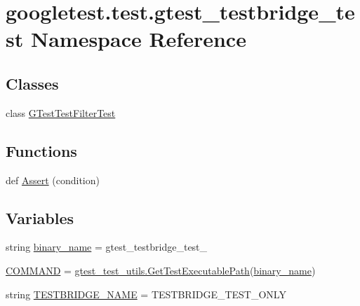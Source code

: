 \hypertarget{namespacegoogletest_1_1test_1_1gtest__testbridge__test}{}\section{googletest.\+test.\+gtest\+\_\+testbridge\+\_\+test Namespace Reference}
\label{namespacegoogletest_1_1test_1_1gtest__testbridge__test}
\subsection*{Classes}
\begin{DoxyCompactItemize}
\item 
class \mbox{\hyperlink{classgoogletest_1_1test_1_1gtest__testbridge__test_1_1_g_test_test_filter_test}{G\+Test\+Test\+Filter\+Test}}
\end{DoxyCompactItemize}
\subsection*{Functions}
\begin{DoxyCompactItemize}
\item 
def \mbox{\hyperlink{namespacegoogletest_1_1test_1_1gtest__testbridge__test_a50b2fc33de061274aedcf8fc6bca4789}{Assert}} (condition)
\end{DoxyCompactItemize}
\subsection*{Variables}
\begin{DoxyCompactItemize}
\item 
string \mbox{\hyperlink{namespacegoogletest_1_1test_1_1gtest__testbridge__test_a59ccdbf94eb879ba6516ba5b6c72719d}{binary\+\_\+name}} = \textquotesingle{}gtest\+\_\+testbridge\+\_\+test\+\_\+\textquotesingle{}
\item 
\mbox{\hyperlink{namespacegoogletest_1_1test_1_1gtest__testbridge__test_ad683cde9a7659541db7f4977ce799374}{C\+O\+M\+M\+A\+ND}} = \mbox{\hyperlink{namespacegoogletest_1_1test_1_1gtest__test__utils_ac9af888c702350aac56b154a6af34098}{gtest\+\_\+test\+\_\+utils.\+Get\+Test\+Executable\+Path}}(\mbox{\hyperlink{namespacegoogletest_1_1test_1_1gtest__testbridge__test_a59ccdbf94eb879ba6516ba5b6c72719d}{binary\+\_\+name}})
\item 
string \mbox{\hyperlink{namespacegoogletest_1_1test_1_1gtest__testbridge__test_a891a204293b2ba9434a8486ac154754d}{T\+E\+S\+T\+B\+R\+I\+D\+G\+E\+\_\+\+N\+A\+ME}} = \textquotesingle{}T\+E\+S\+T\+B\+R\+I\+D\+G\+E\+\_\+\+T\+E\+S\+T\+\_\+\+O\+N\+LY\textquotesingle{}
\end{DoxyCompactItemize}


